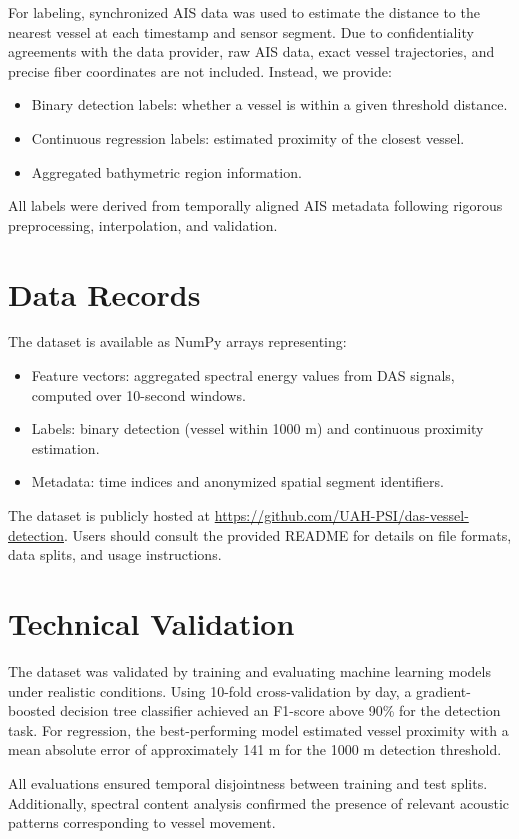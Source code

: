 \documentclass[11pt]{article}
\begin{document}
For labeling, synchronized AIS data was used to estimate the distance to the nearest vessel at each timestamp and sensor segment. Due to confidentiality agreements with the data provider, raw AIS data, exact vessel trajectories, and precise fiber coordinates are not included. Instead, we provide:
\begin{itemize}
  \item Binary detection labels: whether a vessel is within a given threshold distance.
  \item Continuous regression labels: estimated proximity of the closest vessel.
  \item Aggregated bathymetric region information.
\end{itemize}
All labels were derived from temporally aligned AIS metadata following rigorous preprocessing, interpolation, and validation.

\section*{Data Records}
The dataset is available as NumPy arrays representing:
\begin{itemize}
  \item Feature vectors: aggregated spectral energy values from DAS signals, computed over 10-second windows.
  \item Labels: binary detection (vessel within 1000 m) and continuous proximity estimation.
  \item Metadata: time indices and anonymized spatial segment identifiers.
\end{itemize}
The dataset is publicly hosted at \url{https://github.com/UAH-PSI/das-vessel-detection}. Users should consult the provided README for details on file formats, data splits, and usage instructions.

\section*{Technical Validation}
The dataset was validated by training and evaluating machine learning models under realistic conditions. Using 10-fold cross-validation by day, a gradient-boosted decision tree classifier achieved an F1-score above 90\% for the detection task. For regression, the best-performing model estimated vessel proximity with a mean absolute error of approximately 141 m for the 1000 m detection threshold.

All evaluations ensured temporal disjointness between training and test splits. Additionally, spectral content analysis confirmed the presence of relevant acoustic patterns corresponding to vessel movement.
\end{document}
